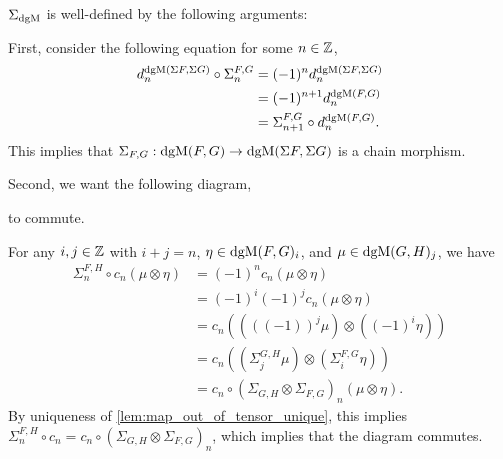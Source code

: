 \begin{remark}
    \( \Sigma_{\operatorname{dgM}} \) is well-defined by the following arguments:

    First, consider the following equation for some \( n \in {\mathbb{Z}} \),
    \begin{align*}
        d_n^{\operatorname{dgM}(\Sigma F, \Sigma G)} \circ \Sigma_n^{F, G} &= (-1)^n d_n^{\operatorname{dgM}(\Sigma F, \Sigma G)} \\
        &= (-1)^{n + 1} d_n^{\operatorname{dgM}(F, G)} \\
        &= \Sigma_{n + 1}^{F, G} \circ d_n^{\operatorname{dgM}(F, G)}.
    \end{align*}
    This implies that \( \Sigma_{F, G}: \operatorname{dgM}(F, G) \to \operatorname{dgM}(\Sigma F, \Sigma G) \) is a chain morphism.

    Second, we want the following diagram,
    \begin{center}
    \end{center}
    to commute.
    
    For any \( i, j \in {\mathbb{Z}} \) with \( i + j = n \), \( \eta \in \operatorname{dgM}(F, G)_i \), and \( \mu \in \operatorname{dgM}(G, H)_j \), we have
    \begin{align*}
        \Sigma_n^{F, H} \circ c_n (\mu \otimes \eta) &= (-1)^n c_n (\mu \otimes \eta) \\
        &= (-1)^i (-1)^j c_n (\mu \otimes \eta) \\
        &= c_n ((((-1))^j \mu) \otimes ((-1)^i \eta)) \\
        &= c_n ((\Sigma_j^{G, H} \mu) \otimes (\Sigma_i^{F, G} \eta)) \\
        &= c_n \circ (\Sigma_{G, H} \otimes \Sigma_{F, G})_n (\mu \otimes \eta).
    \end{align*}
    By uniqueness of \autoref{lem:map_out_of_tensor_unique}, this implies \( \Sigma_n^{F, H} \circ c_n = c_n \circ (\Sigma_{G, H} \otimes \Sigma_{F, G})_n \), which implies that the diagram commutes.


\end{remark}
